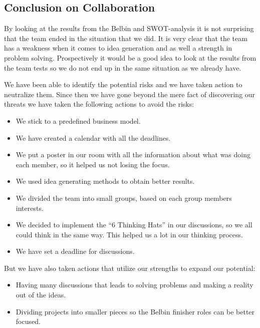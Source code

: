 
\subsection{Conclusion on Collaboration}

By looking at the results from the Belbin and SWOT-analysis it is not surprising that the team ended in the situation that we did. It is very clear that the team has a weakness when it comes to idea generation and as well a strength in problem solving. Prospectively it would be a good idea to look at the results from the team tests so we do not end up in the same situation as we already have.


We have been able to identify the potential risks and we have taken action to neutralize them. 
Since then we have gone beyond the mere fact of discovering our threats we have taken the following actions to avoid the risks:

\begin{itemize}[-]
\item We stick to a predefined business model.
\item We have created a calendar with all the deadlines.
\item We put a poster in our room with all the information about what was doing each member, so it helped us not losing the focus.
\item We used idea generating methods to obtain better results.
\item We divided the team into small groups, based on each group members interests.
\item We decided to implement the ``6 Thinking Hats'' in our discussions, so we all could think in the same way. This helped us a lot in our thinking process.
\item We have set a deadline for discussions.
\end{itemize}


But we have also taken actions that utilize our strengths to expand our potential:

\begin{itemize}[-]
\item Having many discussions that leads to solving problems and making a reality out of the ideas.
\item Dividing projects into smaller pieces so the Belbin finisher roles can be better focused. 
\end{itemize}
